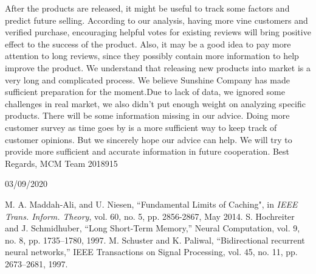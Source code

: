 \documentclass[12pt]{article}
\begin{document}
After the products are released, it might be useful to track some factors and predict future selling. According to our analysis, having more vine customers and verified purchase, encouraging helpful votes for existing reviews will bring positive effect to the success of the product. Also, it may be a good idea to pay more attention to long reviews, since they possibly contain more information to help improve the product. 
\vskip 0.1in
We understand that releasing new products into market is a very long and complicated process. We believe Sunshine Company has made sufficient preparation for the moment.Due to lack of data, we ignored some challenges in real market, we also didn't put enough weight on analyzing specific products. There will be some information missing in our advice. Doing more customer survey as time goes by is a more sufficient way to keep track of customer opinions. But we sincerely hope our advice can help. We will try to provide more sufficient and accurate information in future cooperation. 
\vskip 0.2in
Best Regards,
\vskip 0.2in
MCM Team 2018915

03/09/2020


\newpage
\begin{thebibliography}{14}
	M. A. Maddah-Ali, and U. Niesen,  ``Fundamental Limits of Caching", in \emph{IEEE Trans. Inform. Theory}, vol. 60, no. 5, pp. 2856-2867, May 2014.
	S. Hochreiter and J. Schmidhuber, “Long Short-Term Memory,” Neural Computation, vol. 9, no. 8, pp. 1735–1780, 1997.
     M. Schuster and K. Paliwal, “Bidirectional recurrent neural networks,” IEEE Transactions on Signal Processing, vol. 45, no. 11, pp. 2673–2681, 1997.
\end{thebibliography}
\pagebreak


\end{document}
